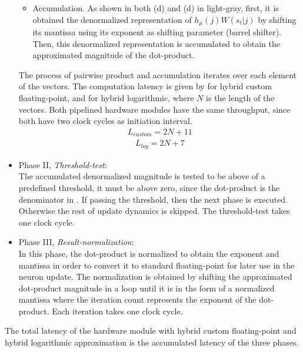 \begin{itemize}
\begin{itemize}[label={--}]
 		\item{Accumulation}. As shown in both (d) and (d) in light-gray, first, it is obtained the denormalized representation of $h_\mu(j) W(s_t|j)$ by shifting its mantissa using its exponent as shifting parameter (barrel shifter). Then, this denormalized representation is accumulated to obtain the approximated magnitude of the dot-product.
 	 \end{itemize}
 	The process of pairwise product and accumulation iterates over each element of the vectors. The computation latency is given by  for hybrid custom floating-point, and  for hybrid logarithmic, where $N$ is the length of the vectors. Both pipelined hardware modules have the same throughput, since both have two clock cycles as initiation interval. 	
 	\begin{eqnarray} \label{eq:dot_standard_custom_float_latency}
 	L_{custom}=2N+11
 	\end{eqnarray} 	
	\begin{eqnarray} \label{eq:dot_log_latency}
 	L_{log}=2N+7
 	\end{eqnarray}
 	
 	\item{Phase II, \emph{Threshold-test}}: \\
	The accumulated denormalized magnitude is tested to be above of a predefined threshold, it must be above zero, since the dot-product is the denominator in .
 	If passing the threshold, then the next phase is executed. Otherwise the rest of update dynamics is skipped. The threshold-test takes one clock cycle.
 	\item{Phase III, \emph{Result-normalization}}: \\
 	In this phase, the dot-product is normalized to obtain the exponent and mantissa in order to convert it to standard floating-point for later use in the neuron update. The normalization is obtained by shifting the approximated dot-product magnitude in a loop until it is in the form of a normalized mantissa where the iteration count represents the exponent of the dot-product. Each iteration takes one clock cycle.
 	
 \end{itemize}


The total latency of the hardware module with hybrid custom floating-point and hybrid logarithmic approximation is the accumulated latency of the three phases.

